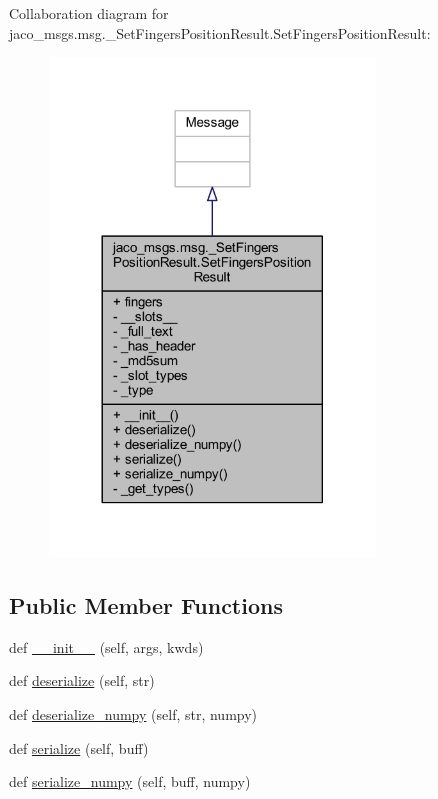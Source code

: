 Collaboration diagram for jaco\+\_\+msgs.\+msg.\+\_\+\+Set\+Fingers\+Position\+Result.\+Set\+Fingers\+Position\+Result\+:
\nopagebreak
\begin{figure}[H]
\begin{center}
\leavevmode
\includegraphics[width=245pt]{d0/d98/classjaco__msgs_1_1msg_1_1__SetFingersPositionResult_1_1SetFingersPositionResult__coll__graph}
\end{center}
\end{figure}
\subsection*{Public Member Functions}
\begin{DoxyCompactItemize}
\item 
def \hyperlink{classjaco__msgs_1_1msg_1_1__SetFingersPositionResult_1_1SetFingersPositionResult_a6ba722678d3b63284b3387e6aaaeb263}{\+\_\+\+\_\+init\+\_\+\+\_\+} (self, args, kwds)
\item 
def \hyperlink{classjaco__msgs_1_1msg_1_1__SetFingersPositionResult_1_1SetFingersPositionResult_a3eaef60bf516584bb9c250a4da437ed3}{deserialize} (self, str)
\item 
def \hyperlink{classjaco__msgs_1_1msg_1_1__SetFingersPositionResult_1_1SetFingersPositionResult_a1b41307d70e509fe8461b379dd4d8a54}{deserialize\+\_\+numpy} (self, str, numpy)
\item 
def \hyperlink{classjaco__msgs_1_1msg_1_1__SetFingersPositionResult_1_1SetFingersPositionResult_ae26d23b4e3eed3bbe6332d211cce2bba}{serialize} (self, buff)
\item 
def \hyperlink{classjaco__msgs_1_1msg_1_1__SetFingersPositionResult_1_1SetFingersPositionResult_a9cc7c6ebe866733c34bbff9fd8d01b42}{serialize\+\_\+numpy} (self, buff, numpy)
\end{DoxyCompactItemize}
